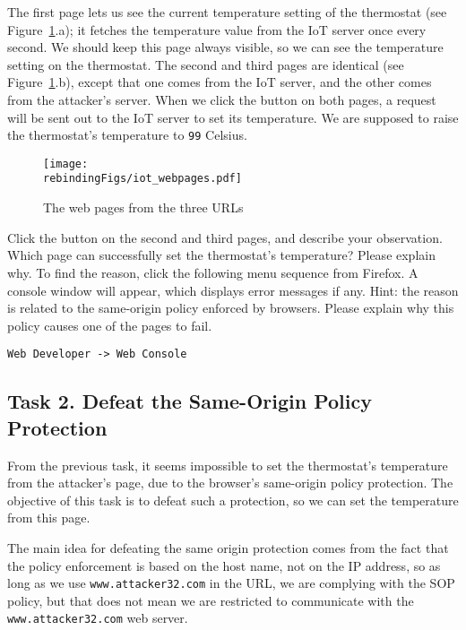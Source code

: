  
The first page lets us see the current temperature setting of the thermostat (see
Figure~\ref{rebinding:fig:webpages}.a); it fetches
the temperature value from the IoT server once every second. We should keep this page always
visible, so we can see the temperature setting on the thermostat. 
The second and third pages
are identical (see Figure~\ref{rebinding:fig:webpages}.b), 
except that one comes from the IoT server, and the other comes from
the attacker's server. When we click the button on both pages, 
a request will be sent out to the IoT server to set its temperature. 
We are supposed to raise the thermostat's temperature 
to \texttt{99} Celsius.  


\begin{figure}[htb]
\begin{center}
\texttt{[image: \\rebindingFigs/iot\_webpages.pdf]}
\end{center}
\caption{The web pages from the three URLs}
\label{rebinding:fig:webpages}
\end{figure}
 

Click the button on the second and third pages, and describe your observation. Which page
can successfully set the thermostat's temperature? Please explain why. 
To find the reason, click the following menu sequence from Firefox. A console window will appear,
which displays error messages if any. Hint: the reason is related to the same-origin policy 
enforced by browsers. Please explain why this policy causes one of the pages to fail.
 
\begin{lstlisting}
Web Developer -> Web Console
\end{lstlisting}
  


\subsection{Task 2. Defeat the Same-Origin Policy Protection}


From the previous task, it seems impossible to
set the thermostat's temperature from the attacker's
page, due to the browser's   
same-origin policy protection.  The objective of this task
is to defeat such a protection, so we can set the 
temperature from this page. 


The main idea for defeating the same origin protection 
comes from the fact that the policy enforcement is 
based on the host name, not on the IP address, so as long as 
we use \texttt{www.attacker32.com} in the URL, we are complying with
the SOP policy, but that does not mean we are restricted 
to communicate with the \texttt{www.attacker32.com} web server.  


